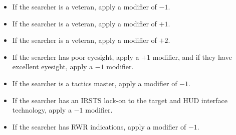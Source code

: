 {\begin{itemize}
    \item {} If the searcher is a veteran, apply a modifier of $-1$.
    \item {} If the searcher is a veteran, apply a modifier of $+1$.
    \item {} If the searcher is a veteran, apply a modifier of $+2$.
    \item {} If the searcher has poor eyesight, apply a $+1$ modifier, and if they have excellent eyesight, apply a $-1$ modifier.
    \item {} If the searcher is a tactics master, apply a modifier of $-1$.
    \item {} If the searcher has an IRSTS lock-on to the target and HUD interface technology, apply a $-1$ modifier.
    \item {} If the searcher has RWR indications, apply a modifier of $-1$.

\end{itemize}

}

